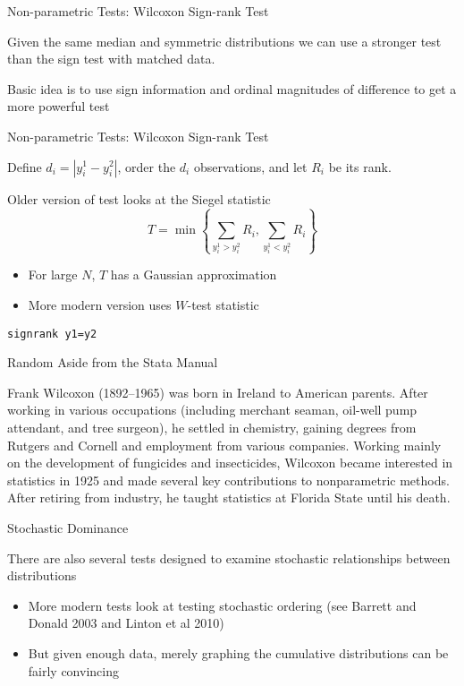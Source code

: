 \documentclass{beamer}
\begin{document}
\begin{frame}{Non-parametric Tests: Wilcoxon Sign-rank Test}
\begin{card} Given the same median and symmetric distributions we can use a stronger test than the sign test with matched data.

Basic idea is to use sign information and ordinal magnitudes of difference to get a more powerful test
\end{card}
\end{frame}
\begin{frame}{Non-parametric Tests: Wilcoxon Sign-rank Test}
\begin{card}
Define $d_i=\left|y^1_i-y^2_i \right|$, order the $d_i$ observations, and let $R_i$ be its rank.
\end{card}

\begin{card}
Older version of test looks at the Siegel statistic
  $$T=\min\left\{\sum_{y^1_i>y^2_i} R_i ,\sum_{y^1_i<y^2_i}R_i\right\}$$
\begin{itemize}
		\item For large $N$, $T$ has a Gaussian approximation
		\item More modern version uses $W$-test statistic
	\end{itemize}
\end{card}
\end{frame}
\begin{frame}
    \begin{card}[STATA]
        \texttt{signrank y1=y2}
    \end{card}
\end{frame}

\begin{frame}{Random Aside from the Stata Manual}
	\begin{card}
		Frank Wilcoxon (1892--1965) was born in Ireland to American parents. After working in various occupations (including merchant seaman, oil-well pump attendant, and tree surgeon), he settled in chemistry, gaining degrees from Rutgers and Cornell and employment from various companies. Working mainly on the development of fungicides and insecticides, Wilcoxon became interested in statistics in 1925 and made several key contributions to nonparametric methods. After retiring from industry, he taught statistics at Florida State until his death.
	\end{card}
\end{frame}

\begin{frame}{Stochastic Dominance}
	\begin{card}There are also several  tests designed to examine stochastic relationships between distributions
\begin{itemize}
		\item More modern tests look at testing stochastic ordering (see Barrett and Donald 2003 and Linton et al 2010)
		\item But given enough data, merely graphing the cumulative distributions can be fairly convincing
	\end{itemize}
\end{card}
\end{frame}
\end{document}
